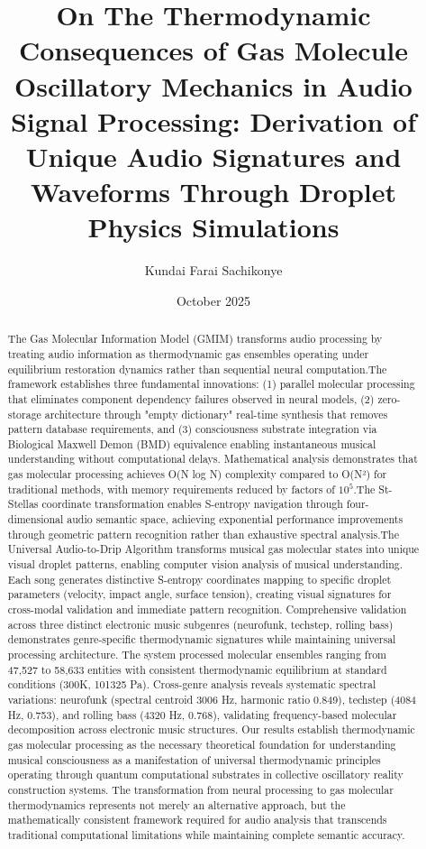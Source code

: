 \documentclass[12pt,a4paper]{article}
\title{On The Thermodynamic Consequences of Gas Molecule Oscillatory Mechanics in Audio Signal Processing: Derivation of Unique Audio Signatures and Waveforms Through Droplet Physics Simulations}
\author{Kundai Farai Sachikonye }
\date{October 2025}
\begin{document}
\maketitle

\begin{abstract}

    The Gas Molecular Information Model (GMIM) transforms audio processing by treating audio information as thermodynamic gas ensembles operating under equilibrium restoration dynamics rather than sequential neural computation.The framework establishes three fundamental innovations: (1) parallel molecular processing that eliminates component dependency failures observed in neural models, (2) zero-storage architecture through "empty dictionary" real-time synthesis that removes pattern database requirements, and (3) consciousness substrate integration via Biological Maxwell Demon (BMD) equivalence enabling instantaneous musical understanding without computational delays. Mathematical analysis demonstrates that gas molecular processing achieves O(N log N) complexity compared to O(N²) for traditional methods, with memory requirements reduced by factors of $10^{5}$.The St-Stellas coordinate transformation enables S-entropy navigation through four-dimensional audio semantic space, achieving exponential performance improvements through geometric pattern recognition rather than exhaustive spectral analysis.The Universal Audio-to-Drip Algorithm transforms musical gas molecular states into unique visual droplet patterns, enabling computer vision analysis of musical understanding. Each song generates distinctive S-entropy coordinates mapping to specific droplet parameters (velocity, impact angle, surface tension), creating visual signatures for cross-modal validation and immediate pattern recognition.
    Comprehensive validation across three distinct electronic music subgenres (neurofunk, techstep, rolling bass) demonstrates genre-specific thermodynamic signatures while maintaining universal processing architecture. The system processed molecular ensembles ranging from 47,527 to 58,633 entities with consistent thermodynamic equilibrium at standard conditions (300K, 101325 Pa). Cross-genre analysis reveals systematic spectral variations: neurofunk (spectral centroid 3006 Hz, harmonic ratio 0.849), techstep (4084 Hz, 0.753), and rolling bass (4320 Hz, 0.768), validating frequency-based molecular decomposition across electronic music structures.
    Our results establish thermodynamic gas molecular processing as the necessary theoretical foundation for understanding musical consciousness as a manifestation of universal thermodynamic principles operating through quantum computational substrates in collective oscillatory reality construction systems. The transformation from neural processing to gas molecular thermodynamics represents not merely an alternative approach, but the mathematically consistent framework required for audio analysis that transcends traditional computational limitations while maintaining complete semantic accuracy.

    \end{abstract}
\end{document}
